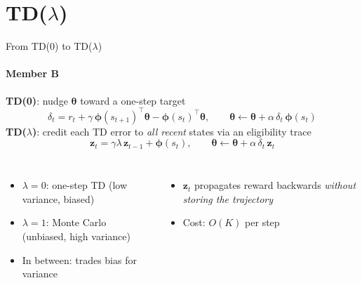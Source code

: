 \documentclass[aspectratio=169,11pt]{beamer}
\newcommand{\memberB}{Member B}
\newcommand{\speaker}[1]{\framesubtitle{#1}}
\newcommand{\vphi}{\bm{\phi}}
\newcommand{\vz}{\mathbf{z}}
\newcommand{\vth}{\bm{\theta}}
\begin{document}
\section{TD($\lambda$)}

\begin{frame}{From TD(0) to TD($\lambda$)}
  \speaker{\memberB}
  \textbf{TD(0)}: nudge $\vth$ toward a one-step target
  \[ \delta_t = r_t + \gamma\,\vphi(s_{t+1})^\top\vth - \vphi(s_t)^\top\vth, \qquad
     \vth \leftarrow \vth + \alpha\,\delta_t\,\vphi(s_t) \]
  \textbf{TD($\lambda$)}: credit each TD error to \emph{all recent} states via an eligibility trace
  \[ \vz_t = \gamma\lambda\,\vz_{t-1} + \vphi(s_t), \qquad \vth \leftarrow \vth + \alpha\,\delta_t\,\vz_t \]
  \begin{columns}[T]
    \begin{itemize}
      \item $\lambda = 0$: one-step TD (low variance, biased)
      \item $\lambda = 1$: Monte Carlo (unbiased, high variance)
      \item In between: trades bias for variance
    \end{itemize}
    \begin{itemize}
      \item $\vz_t$ propagates reward backwards \emph{without storing the trajectory}
      \item Cost: $O(K)$ per step
    \end{itemize}
  \end{columns}
\end{frame}
\end{document}
